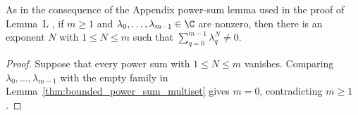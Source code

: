 \begin{corollary}
    \label{cor:nonvanishing_finite_power_sum}
    \leanok
    As in the consequence of the Appendix power-sum lemma
    \cite[Appendix~A, lines~1155--1163]{Cirac2016MPDO_arXiv} used in the proof
    of Lemma~L \cite[Appendix~C.3, lines~1851--1858]{Cirac2016MPDO_arXiv}, if
    $m\geq 1$ and $\lambda_0,\ldots,\lambda_{m-1}\in\C$ are nonzero, then there
    is an exponent $N$ with $1\leq N\leq m$ such that
    $\sum_{q=0}^{m-1}\lambda_q^N\neq 0$.
\end{corollary}

\begin{proof}
    \leanok
    Suppose that every power sum with $1\leq N\leq m$ vanishes. Comparing
    $\lambda_0,\ldots,\lambda_{m-1}$ with the empty family in
    Lemma~\ref{thm:bounded_power_sum_multiset} gives $m=0$, contradicting
    $m\geq 1$.
\end{proof}

